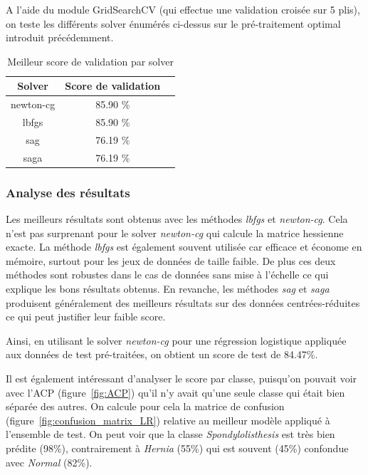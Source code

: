 \documentclass[twocolumn,10pt]{article}
\begin{document}
A l'aide du module GridSearchCV (qui effectue une validation croisée sur 5 plis), on teste les différents solver énumérés ci-dessus sur le pré-traitement optimal introduit précédemment.

\begin{table}[htbp]
    \begin{center}
        \caption{\label{tab:accuracy_LogReg_solver}Meilleur score de validation par solver}
        \begin{tabular}{c|cc}
            {Solver} & Score de validation \\
            \hline
            newton-cg & 85.90 \%\\
            lbfgs & 85.90 \%\\
            sag & 76.19 \% \\
            saga & 76.19 \% \\
        \end{tabular}
    \end{center}
\end{table}

\subsubsection{Analyse des résultats}

Les meilleurs résultats sont obtenus avec les méthodes \textit{lbfgs} et \textit{newton-cg}. Cela n'est pas surprenant pour le solver \textit{newton-cg} qui calcule la matrice hessienne exacte. La méthode \textit{lbfgs} est également souvent utilisée car efficace et économe en mémoire, surtout pour les jeux de données de taille faible. De plus ces deux méthodes sont robustes dans le cas de données sans mise à l'échelle ce qui explique les bons résultats obtenus. En revanche, les méthodes \textit{sag} et \textit{saga} produisent généralement des meilleurs résultats sur des données centrées-réduites ce qui peut justifier leur faible score.

Ainsi, en utilisant le solver \textit{newton-cg} pour une régression logistique appliquée aux données de test pré-traitées, on obtient un score de test de 84.47\%. 

Il est également intéressant d'analyser le score par classe, puisqu'on pouvait voir avec l'ACP (figure~\ref{fig:ACP}) qu'il n'y avait qu'une seule classe qui était bien séparée des autres. On calcule pour cela la matrice de confusion (figure~\ref{fig:confusion_matrix_LR}) relative au meilleur modèle appliqué à l'ensemble de test.
On peut voir que la classe \textit{Spondylolisthesis} est très bien prédite (98\%), contrairement à \textit{Hernia} (55\%) qui est souvent (45\%) confondue avec \textit{Normal} (82\%).
\end{document}
